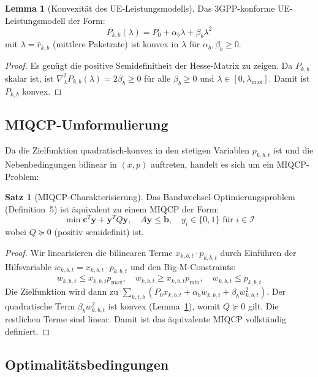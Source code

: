 ﻿\documentclass[a4paper,12pt]{article}
\theoremstyle{definition}
\newtheorem{satz}{Satz}
\newtheorem{lemma}{Lemma}
\begin{document}
\begin{lemma}[Konvexit\"at des UE-Leistungsmodells]
\label{lem:power_convex}
  Das 3GPP-konforme UE-Leistungsmodell der Form:
  \[
    P_{k,b}(\lambda) = P_0 + \alpha_b \lambda + \beta_b \lambda^2
  \]
  mit $\lambda = \bar{r}_{k,b}$ (mittlere Paketrate) ist konvex in $\lambda$
  f\"ur $\alpha_b, \beta_b \geq 0$.
\end{lemma}

\begin{proof}
  Es gen\"ugt die positive Semidefinitheit der Hesse-Matrix zu zeigen.
  Da $P_{k,b}$ skalar ist, ist $\nabla^2_\lambda P_{k,b}(\lambda) = 2\beta_b \geq 0$
  f\"ur alle $\beta_b \geq 0$ und $\lambda \in [0, \lambda_{\max}]$.
  Damit ist $P_{k,b}$ konvex.
\end{proof}

\subsection{MIQCP-Umformulierung}

Da die Zielfunktion quadratisch-konvex in den stetigen Variablen $p_{k,b,t}$ ist und
die Nebenbedingungen bilinear in $(x, p)$ auftreten, handelt es sich um ein MIQCP-Problem:

\begin{satz}[MIQCP-Charakterisierung]
  Das Bandwechsel-Optimierungsproblem (Definition~5) ist \"aquivalent zu einem MIQCP der Form:
  \[
    \min \mathbf{c}^T \mathbf{y} + \mathbf{y}^T Q \mathbf{y}, \quad
    A\mathbf{y} \leq \mathbf{b}, \quad
    y_i \in \{0,1\} \text{ für } i \in \mathcal{I}
  \]
  wobei $Q \succeq 0$ (positiv semidefinit) ist.
\end{satz}

\begin{proof}
  Wir linearisieren die bilinearen Terme $x_{k,b,t} \cdot p_{k,b,t}$ durch
  Einf\"uhren der Hilfsvariable $w_{k,b,t} = x_{k,b,t} \cdot p_{k,b,t}$
  und den Big-M-Constraints:
  \[
    w_{k,b,t} \leq x_{k,b,t} p_{\max}, \quad
    w_{k,b,t} \geq x_{k,b,t} p_{\min}, \quad
    w_{k,b,t} \leq p_{k,b,t}
  \]
  Die Zielfunktion wird dann zu $\sum_{k,t,b} (P_0 x_{k,b,t} + \alpha_b w_{k,b,t}
  + \beta_b w_{k,b,t}^2)$.
  Der quadratische Term $\beta_b w_{k,b,t}^2$ ist konvex (Lemma~\ref{lem:power_convex}),
  womit $Q \succeq 0$ gilt. Die restlichen Terme sind linear. Damit ist das
  \"aquivalente MIQCP vollst\"andig definiert.
\end{proof}

\subsection{Optimalit\"atsbedingungen}
\end{document}

